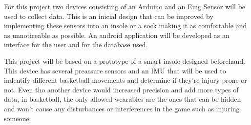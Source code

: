 For this project two devices consisting of an Arduino and an Emg Sensor will be used to collect data. This is an inicial design that can be improved by implementing these sensors into an 
insole or a sock making it as comfortable and as unnoticeable as possible. An android application will be developed as an interface for the user and for the database used.



This project will be based on a prototype of a smart insole designed beforehand. This device has several preassure sensors and an IMU that will be used to indentify different basketball 
movements and determine if they're injury prone or not\cite{masterInsole, bachelorInsole}.
Even tho another device would increased precision and add more types of data, in basketball, the only allowed wearables are the ones that can be hidden and won't cause any disturbances 
or interferences in the game such as injuring someone. 


